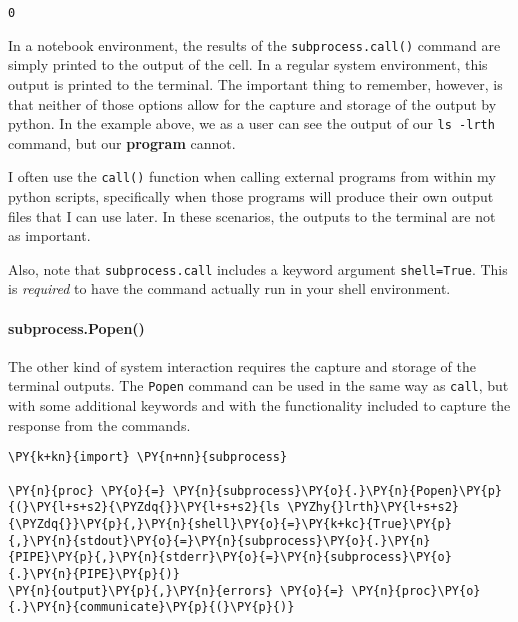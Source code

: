             \begin{tcolorbox}[breakable, size=fbox, boxrule=.5pt, pad at break*=1mm, opacityfill=0]
\begin{Verbatim}[commandchars=\\\{\}]
0
\end{Verbatim}
\end{tcolorbox}
        
    In a notebook environment, the results of the \texttt{subprocess.call()}
command are simply printed to the output of the cell. In a regular
system environment, this output is printed to the terminal. The
important thing to remember, however, is that neither of those options
allow for the capture and storage of the output by python. In the
example above, we as a user can see the output of our \texttt{ls\ -lrth}
command, but our \textbf{program} cannot.

I often use the \texttt{call()} function when calling external programs
from within my python scripts, specifically when those programs will
produce their own output files that I can use later. In these scenarios,
the outputs to the terminal are not as important.

Also, note that \texttt{subprocess.call} includes a keyword argument
\texttt{shell=True}. This is \emph{required} to have the command
actually run in your shell environment.

\hypertarget{subprocess.popen}{%
\paragraph{subprocess.Popen()}\label{subprocess.popen}}

The other kind of system interaction requires the capture and storage of
the terminal outputs. The \texttt{Popen} command can be used in the same
way as \texttt{call}, but with some additional keywords and with the
functionality included to capture the response from the commands.

    \begin{tcolorbox}[breakable, size=fbox, boxrule=1pt, pad at break*=1mm,colback=cellbackground, colframe=cellborder]
\begin{Verbatim}[commandchars=\\\{\}]
\PY{k+kn}{import} \PY{n+nn}{subprocess}

\PY{n}{proc} \PY{o}{=} \PY{n}{subprocess}\PY{o}{.}\PY{n}{Popen}\PY{p}{(}\PY{l+s+s2}{\PYZdq{}}\PY{l+s+s2}{ls \PYZhy{}lrth}\PY{l+s+s2}{\PYZdq{}}\PY{p}{,}\PY{n}{shell}\PY{o}{=}\PY{k+kc}{True}\PY{p}{,}\PY{n}{stdout}\PY{o}{=}\PY{n}{subprocess}\PY{o}{.}\PY{n}{PIPE}\PY{p}{,}\PY{n}{stderr}\PY{o}{=}\PY{n}{subprocess}\PY{o}{.}\PY{n}{PIPE}\PY{p}{)}
\PY{n}{output}\PY{p}{,}\PY{n}{errors} \PY{o}{=} \PY{n}{proc}\PY{o}{.}\PY{n}{communicate}\PY{p}{(}\PY{p}{)}
\end{Verbatim}
\end{tcolorbox}


